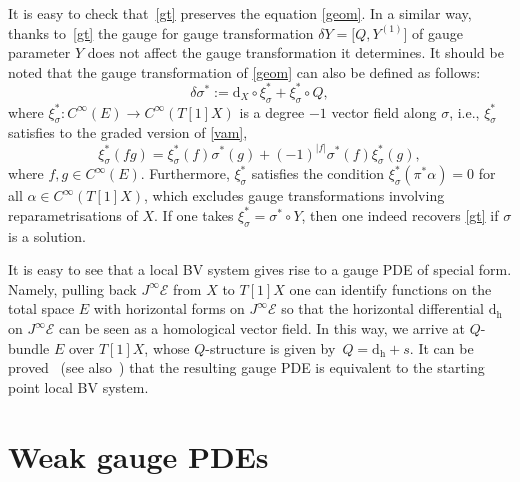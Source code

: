 \documentclass[10pt,a4paper]{amsart}
\numberwithin{equation}{section}
\theoremstyle{definition}
\newcommand{\dx}{\mathrm{d}_X}
\renewcommand{\dh}{\mathrm{d_h}}
\def\cE{\mathcal{E}}
\begin{document}
It is easy to check that~\eqref{gt} preserves the equation \eqref{geom}. In a similar way, thanks to~\eqref{gt}
the gauge for gauge transformation $\delta Y=\bigl[Q,Y^{(1)}\bigr]$ of gauge parameter $Y$ does not affect the gauge transformation it determines. It should be noted that the gauge transformation of \eqref{geom} can also be defined as follows:
\begin{equation*}
 \delta\sigma^*:=\dx\circ\xi^*_{\sigma}+\xi^*_{\sigma}\circ Q,
\end{equation*}
where $\xi^*_{\sigma}\colon C^{\infty}(E)\rightarrow C^{\infty}(T[1]X)$ is a degree $-1$ vector field along $\sigma$, i.e., $\xi^*_{\sigma}$ satisfies to the graded version of \eqref{vam},
\begin{equation*}
 \xi^*_{\sigma}(fg)=\xi^*_{\sigma}(f)\sigma^*(g)+(-1)^{|f|}\sigma^*(f)\xi^*_{\sigma}(g),
\end{equation*}
where $f,g\in C^{\infty}(E)$. Furthermore, $\xi^*_{\sigma}$ satisfies the condition $ \xi^*_{\sigma}(\pi^*\alpha)=0$ for all $\alpha\in C^{\infty}(T[1]X) $, which excludes gauge transformations involving reparametrisations of $X$. If one takes $\xi^*_{\sigma}=\sigma^*\circ Y$, then one indeed recovers \eqref{gt} if $\sigma$ is a solution.

It is easy to see that a local BV system gives rise to a gauge PDE of special form. Namely, pulling back $J^\infty\cE$ from $X$ to $T[1]X$ one can identify functions on the total space $E$ with horizontal forms on $J^\infty\cE$ so that the horizontal differential $\dh$ on $J^\infty\cE$ can be seen as a homological vector field. In this way, we arrive at $Q$-bundle $E$ over $T[1]X$, whose $Q$-structure is given by~${Q=\dh+s}$. It can be proved~\cite{Barnich:2010sw} (see also~\cite{Barnich:2004cr,Grigoriev:2019ojp}) that the resulting gauge PDE is equivalent to the starting point local BV system.


\section{Weak gauge PDEs}\label{sec:wgpde}
\end{document}
